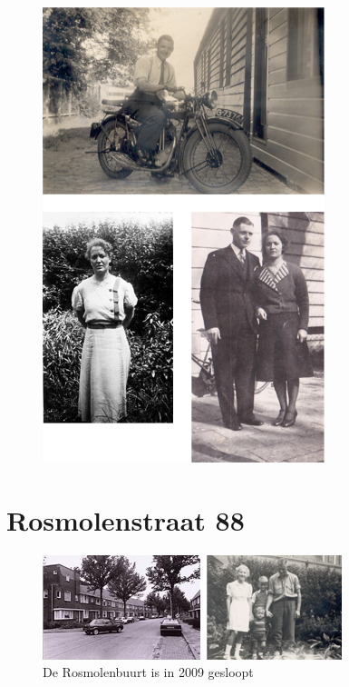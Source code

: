 \documentclass[12pt,twoside, openright]{memoir}
\begin{document}
\begin{figure}
\includegraphics[width=\textwidth]{img/ch4/ouders2}
\caption*{\footnotesize }
\end{figure}


\chapter{Rosmolenstraat 88} %
\label{cha:rosmolenstraat}

\begin{figure}
\includegraphics[width=\textwidth]{img/ch5/rosmolen2}
\caption*{\footnotesize De Rosmolenbuurt is in 2009 gesloopt}
\end{figure}
\end{document}
